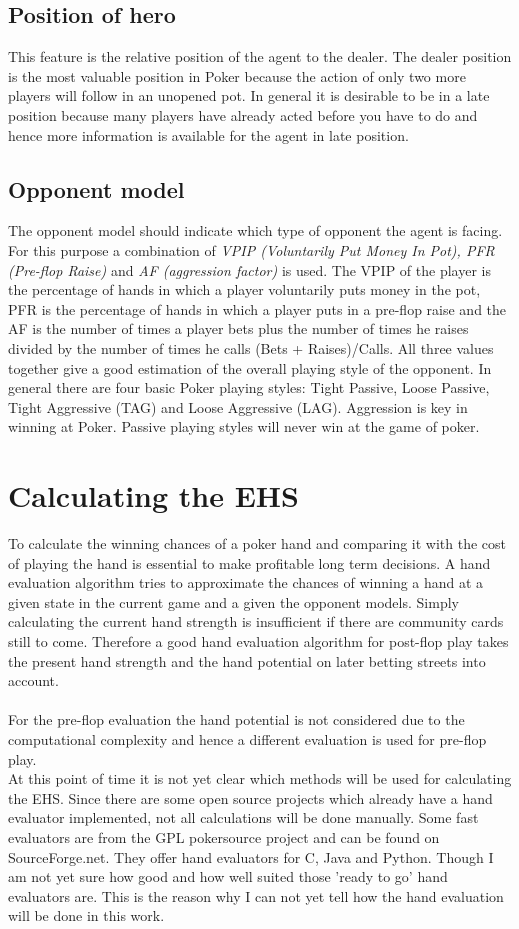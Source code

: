\section{Position of hero}
This feature is the relative position of the agent to the dealer. The dealer position is the most valuable position in Poker because the action of only two more players will follow in an unopened pot. In general it is desirable to be in a late position because many players have already acted before you have to do and hence more information is available for the agent in late position.
\section{Opponent model}
The opponent model should indicate which type of opponent the agent is facing. For this purpose a combination of \textit{VPIP (Voluntarily Put Money In Pot), PFR (Pre-flop Raise)} and \textit{AF (aggression factor)} is used. The VPIP of the player is the percentage of hands in which a player voluntarily puts money in the pot, PFR is the percentage of hands in which a player puts in a pre-flop raise and the AF is the number of times a player bets plus the number of times he raises divided by the number of times he calls (Bets + Raises)/Calls. All three values together give a good estimation of the overall playing style of the opponent. In general there are four basic Poker playing styles: Tight Passive, Loose Passive, Tight Aggressive (TAG) and Loose Aggressive (LAG). Aggression is key in winning at Poker. Passive playing styles will never win at the game of poker.

\chapter{Calculating the EHS}
To calculate the winning chances of a poker hand and comparing it with the cost of playing the hand is essential to make profitable long term decisions.
A hand evaluation algorithm tries to approximate the chances of winning a hand at a given state in the current game and a given the opponent models. Simply calculating the current hand strength is insufficient if there are community cards still to come. Therefore a good hand evaluation algorithm for post-flop play takes
the present hand strength and the hand potential on later betting streets into account.\cite{ehs}\\\\
For the pre-flop evaluation the hand potential is not considered due to the computational complexity and hence a different evaluation is used for pre-flop play.\cite{ehs}\\
At this point of time it is not yet clear which methods will be used for calculating the EHS. Since there are some open source projects which already have a hand evaluator implemented, not all calculations will be done manually. Some fast evaluators are from the GPL pokersource project and can be found on SourceForge.net. They offer hand evaluators for C, Java and Python. Though I am not yet sure how good and how well suited those 'ready to go' hand evaluators are. This is the reason why I can not yet tell how the hand evaluation will be done in this work.

